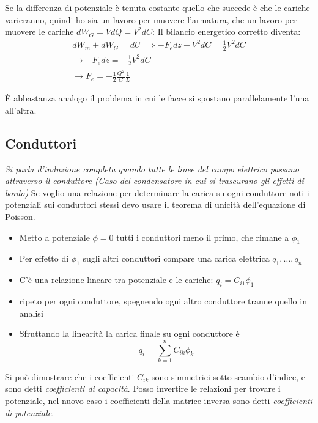 \documentclass[a4paper]{scrarticle}
\begin{document}
Se la differenza di potenziale è tenuta costante quello che succede è che le cariche varieranno, quindi ho sia un lavoro per muovere l'armatura, che un lavoro per muovere le cariche $dW_G = VdQ = V^2 dC$:
Il bilancio energetico corretto diventa:
\begin{gather*}
    dW_m + dW_G = dU \implies -F_edz + V^2dC = \frac{1}{2}V^2dC\\
    \to -F_e dz = -\frac{1}{2}V^2dC\\
    \to F_e = -\frac{1}{2}\frac{Q^2}{C}\frac{1}{L}
\end{gather*}

È abbastanza analogo il problema in cui le facce si spostano parallelamente l'una all'altra.

\subsection{Conduttori}

\emph{Si parla d'induzione completa quando tutte le linee del campo elettrico passano attraverso il conduttore (Caso del condensatore in cui si trascurano gli effetti di bordo)}
Se voglio una relazione per determinare la carica su ogni conduttore noti i potenziali sui conduttori stessi devo usare il teorema di unicità dell'equazione di Poisson.

\begin{itemize}
    \item Metto a potenziale $ \phi = 0 $ tutti i conduttori meno il primo, che rimane a $\phi_1$
    \item Per effetto di $\phi_1$ sugli altri conduttori compare una carica elettrica $q_1, \dots, q_n$
    \item C'è una relazione lineare tra potenziale e le cariche: $q_i = C_{i1} \phi_1$
    \item ripeto per ogni conduttore, spegnendo ogni altro conduttore tranne quello in analisi
    \item Sfruttando la linearità la carica finale su ogni conduttore è 
    \begin{equation}
        q_i = \sum_{k=1}^{n}C_{ik} \phi_k
    \end{equation}
\end{itemize}

Si può dimostrare che i coefficienti $C_{ik}$ sono simmetrici sotto scambio d'indice, e sono detti \emph{coefficienti di capacità}.
Posso invertire le relazioni per trovare i potenziale, nel nuovo caso i coefficienti della matrice inversa sono detti \emph{coefficienti di potenziale}.
\end{document}
